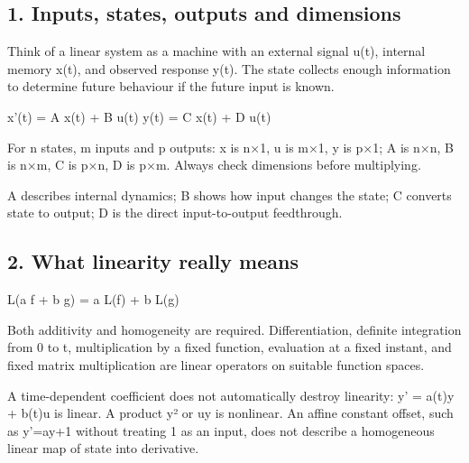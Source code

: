 \documentclass[11pt,a4paper]{article}
\begin{document}
\subsection{1. Inputs, states, outputs and dimensions}
\begin{conceptbox}Think of a linear system as a machine with an external signal u(t), internal memory x(t), and observed response y(t). The state collects enough information to determine future behaviour if the future input is known.\end{conceptbox}
\begin{equationbox}\raggedright
{\ttfamily\small x'(t) = A x(t) + B u(t) y(t) = C x(t) + D u(t)}\par
\end{equationbox}
\begin{conceptbox}For n states, m inputs and p outputs: x is n×1, u is m×1, y is p×1; A is n×n, B is n×m, C is p×n, D is p×m. Always check dimensions before multiplying.\end{conceptbox}
\begin{conceptbox}A describes internal dynamics; B shows how input changes the state; C converts state to output; D is the direct input-to-output feedthrough.\end{conceptbox}

\subsection{2. What linearity really means}
\begin{equationbox}\raggedright
{\ttfamily\small L(a f + b g) = a L(f) + b L(g)}\par
\end{equationbox}
\begin{conceptbox}Both additivity and homogeneity are required. Differentiation, definite integration from 0 to t, multiplication by a fixed function, evaluation at a fixed instant, and fixed matrix multiplication are linear operators on suitable function spaces.\end{conceptbox}
\begin{conceptbox}A time-dependent coefficient does not automatically destroy linearity: y' = a(t)y + b(t)u is linear. A product y² or uy is nonlinear. An affine constant offset, such as y'=ay+1 without treating 1 as an input, does not describe a homogeneous linear map of state into derivative.\end{conceptbox}
\end{document}
